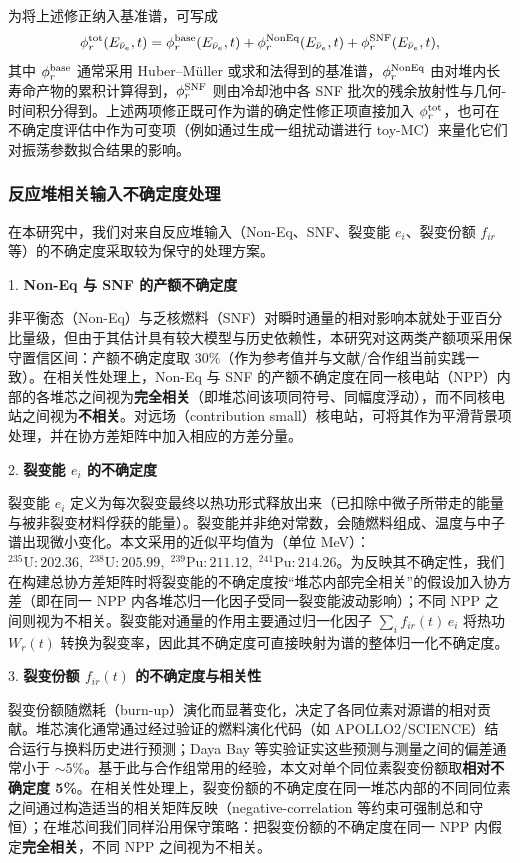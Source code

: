 为将上述修正纳入基准谱，可写成
\begin{equation}
\phi_r^{\rm tot}(E_{\bar{\nu}_e},t)
= \phi_r^{\rm base}(E_{\bar{\nu}_e},t)
+ \phi_r^{\rm NonEq}(E_{\bar{\nu}_e},t)
+ \phi_r^{\rm SNF}(E_{\bar{\nu}_e},t),
\label{eq:phi-r-tot}
\end{equation}
其中 $\phi_r^{\rm base}$ 通常采用 Huber–Müller 或求和法得到的基准谱，$\phi_r^{\rm NonEq}$ 由对堆内长寿命产物的累积计算得到，$\phi_r^{\rm SNF}$ 则由冷却池中各 SNF 批次的残余放射性与几何-时间积分得到。上述两项修正既可作为谱的确定性修正项直接加入 $\phi_r^{\rm tot}$，也可在不确定度评估中作为可变项（例如通过生成一组扰动谱进行 toy-MC）来量化它们对振荡参数拟合结果的影响。

\subsubsection{反应堆相关输入不确定度处理}
在本研究中，我们对来自反应堆输入（Non-Eq、SNF、裂变能 $e_i$、裂变份额 $f_{ir}$ 等）的不确定度采取较为保守的处理方案。

1. \textbf{Non-Eq 与 SNF 的产额不确定度}

非平衡态（Non-Eq）与乏核燃料（SNF）对瞬时通量的相对影响本就处于亚百分比量级，但由于其估计具有较大模型与历史依赖性，本研究对这两类产额项采用保守置信区间：产额不确定度取 $30\%$（作为参考值并与文献/合作组当前实践一致）。在相关性处理上，Non-Eq 与 SNF 的产额不确定度在同一核电站（NPP）内部的各堆芯之间视为\textbf{完全相关}（即堆芯间该项同符号、同幅度浮动），而不同核电站之间视为\textbf{不相关}。对远场（contribution small）核电站，可将其作为平滑背景项处理，并在协方差矩阵中加入相应的方差分量。

2. \textbf{裂变能 $e_i$ 的不确定度}

裂变能 $e_i$ 定义为每次裂变最终以热功形式释放出来（已扣除中微子所带走的能量与被非裂变材料俘获的能量）。裂变能并非绝对常数，会随燃料组成、温度与中子谱出现微小变化。本文采用的近似平均值为（单位 MeV）：${}^{235}\mathrm{U}:202.36,\; {}^{238}\mathrm{U}:205.99,\; {}^{239}\mathrm{Pu}:211.12,\; {}^{241}\mathrm{Pu}:214.26$。为反映其不确定性，我们在构建总协方差矩阵时将裂变能的不确定度按“堆芯内部完全相关”的假设加入协方差（即在同一 NPP 内各堆芯归一化因子受同一裂变能波动影响）；不同 NPP 之间则视为不相关。裂变能对通量的作用主要通过归一化因子 $\sum_i f_{ir}(t)\,e_i$ 将热功 $W_r(t)$ 转换为裂变率，因此其不确定度可直接映射为谱的整体归一化不确定度。

3. \textbf{裂变份额 $f_{ir}(t)$ 的不确定度与相关性}

裂变份额随燃耗（burn-up）演化而显著变化，决定了各同位素对源谱的相对贡献。堆芯演化通常通过经过验证的燃料演化代码（如 APOLLO2/SCIENCE）结合运行与换料历史进行预测；Daya Bay 等实验证实这些预测与测量之间的偏差通常小于 $\sim 5\%$。基于此与合作组常用的经验，本文对单个同位素裂变份额取\textbf{相对不确定度 5\%}。在相关性处理上，裂变份额的不确定度在同一堆芯内部的不同同位素之间通过构造适当的相关矩阵反映（negative-correlation 等约束可强制总和守恒）；在堆芯间我们同样沿用保守策略：把裂变份额的不确定度在同一 NPP 内假定\textbf{完全相关}，不同 NPP 之间视为不相关。

